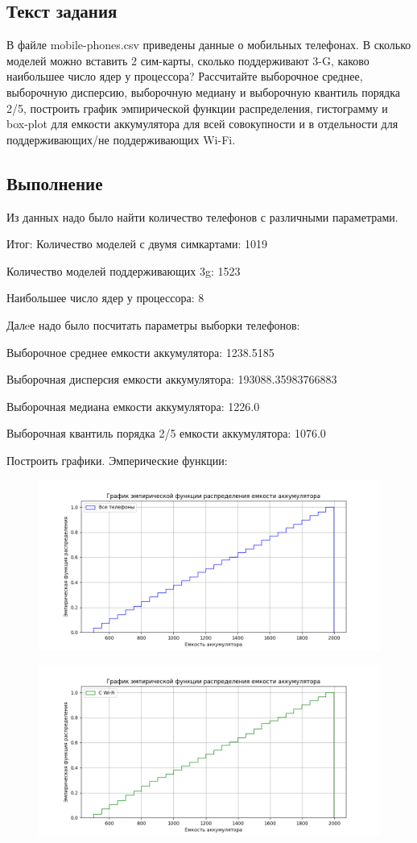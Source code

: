 \documentclass{article}
\begin{document}
\subsection{Текст задания} 

В файле mobile-phones.csv приведены данные о мобильных телефонах.
В сколько моделей можно вставить 2 сим-карты, сколько поддерживают 3-G, каково наибольшее число ядер у процессора?
Рассчитайте выборочное среднее, выборочную дисперсию, выборочную медиану и выборочную квантиль порядка 2/5, построить график эмпирической функции распределения,
гистограмму и box-plot для емкости аккумулятора для всей совокупности и в отдельности для поддерживающих/не поддерживающих Wi-Fi.


\subsection{Выполнение}\label{subsec:2}
Из данных надо было найти количество телефонов с различными параметрами.

Итог:
Количество моделей с двумя симкартами: 1019

Количество моделей поддерживающих 3g: 1523

Наибольшее число ядер у процессора: 8

Далeе надо было посчитать параметры выборки телефонов:

Выборочное среднее емкости аккумулятора: 1238.5185

Выборочная дисперсия емкости аккумулятора: 193088.35983766883

Выборочная медиана емкости аккумулятора: 1226.0

Выборочная квантиль порядка 2/5 емкости аккумулятора: 1076.0

Построить графики.
Эмперические функции:
\begin{figure}[H]
      \centering
      \includegraphics[width=0.5\linewidth]{Python/emper-all-phones}\label{fig:figure4}
\end{figure}

\begin{figure}[H]
      \centering
      \includegraphics[width=0.5\linewidth]{Python/emper-wi-fi}\label{fig:figure5}
\end{figure}
\end{document}
